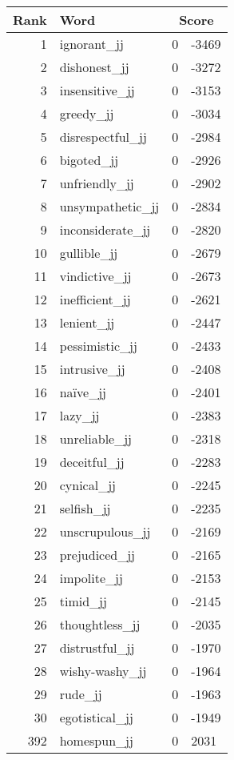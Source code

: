 \begin{longtable}[!htbp]{| rlr@{.}l |}
    \hline
    \textbf{Rank} & \textbf{Word} & \multicolumn{2}{c|}{\textbf{Score}} \\
    \hline
    \endhead
    1 & ignorant\_jj & 0 & -3469 \\
    2 & dishonest\_jj & 0 & -3272 \\
    3 & insensitive\_jj & 0 & -3153 \\
    4 & greedy\_jj & 0 & -3034 \\
    5 & disrespectful\_jj & 0 & -2984 \\
    6 & bigoted\_jj & 0 & -2926 \\
    7 & unfriendly\_jj & 0 & -2902 \\
    8 & unsympathetic\_jj & 0 & -2834 \\
    9 & inconsiderate\_jj & 0 & -2820 \\
    10 & gullible\_jj & 0 & -2679 \\
    11 & vindictive\_jj & 0 & -2673 \\
    12 & inefficient\_jj & 0 & -2621 \\
    13 & lenient\_jj & 0 & -2447 \\
    14 & pessimistic\_jj & 0 & -2433 \\
    15 & intrusive\_jj & 0 & -2408 \\
    16 & naïve\_jj & 0 & -2401 \\
    17 & lazy\_jj & 0 & -2383 \\
    18 & unreliable\_jj & 0 & -2318 \\
    19 & deceitful\_jj & 0 & -2283 \\
    20 & cynical\_jj & 0 & -2245 \\
    21 & selfish\_jj & 0 & -2235 \\
    22 & unscrupulous\_jj & 0 & -2169 \\
    23 & prejudiced\_jj & 0 & -2165 \\
    24 & impolite\_jj & 0 & -2153 \\
    25 & timid\_jj & 0 & -2145 \\
    26 & thoughtless\_jj & 0 & -2035 \\
    27 & distrustful\_jj & 0 & -1970 \\
    28 & wishy-washy\_jj & 0 & -1964 \\
    29 & rude\_jj & 0 & -1963 \\
    30 & egotistical\_jj & 0 & -1949 \\
    392 & homespun\_jj & 0 & 2031 \\

\end{longtable}
